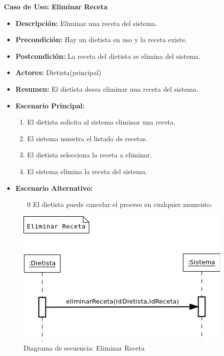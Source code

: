 \textbf{Caso de Uso: Eliminar Receta}
\begin{itemize}
\item \textbf{Descripción:} Eliminar una receta del sistema.
\item \textbf{Precondición:} Hay un dietista en uso y la receta existe.
\item \textbf{Postcondición:} La receta del dietista se elimina del sistema.
\item \textbf{Actores:} Dietista(principal)
\item \textbf{Resumen:} El dietista desea eliminar una receta del sistema.
\item \textbf{Escenario Principal:}
\begin{enumerate}
\item El dietista solicita al sistema eliminar una receta.
\item El sistema muestra el listado de recetas.
\item El dietista selecciona la receta a eliminar.
\item El sistema elimina la receta del sistema.
\end{enumerate}
\item \textbf{Escenario Alternativo:}
\begin{enumerate}
\item[0] El dietista puede cancelar el proceso en cualquier momento.
\end{enumerate}
\end{itemize}
\begin{figure}[H]
  \label{ds_eliminarreceta}
  \begin{center}
    \includegraphics[scale=0.7]{../img/DS_EliminarReceta.png}
  \end{center}
  \caption{Diagrama de secuencia: Eliminar Receta}
\end{figure}
